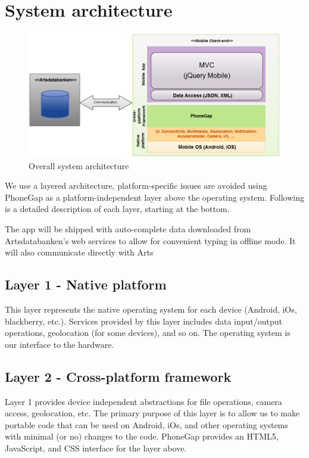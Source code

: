 \section{System architecture}
\begin{figure}[htb]
	\centering
	\includegraphics[width=1.0\textwidth]{architecture/architecture3.png}
	\caption{Overall system architecture}
	\label{fig:architecture}
\end{figure}

We use a layered architecture, platform-specific issues are avoided using
PhoneGap as a platform-independent layer above the operating system. Following
is a detailed description of each layer, starting at the bottom.

The app will be shipped with auto-complete data downloaded from Artsdatabanken's
web services to allow for convenient typing in offline mode. It will also
communicate directly with Arts

\subsection{Layer 1 - Native platform}

This layer represents the native operating system for each device (Android, iOs,
blackberry, etc.). Services provided by this layer includes data input/output
operations, geolocation (for some devices), and so on. The operating system is
our interface to the hardware.

\subsection{Layer 2 - Cross-platform framework}

Layer 1 provides device independent abstractions for file operations, camera
access, geolocation, etc. The primary purpose of this layer is to allow us to
make portable code that can be used on Android, iOs, and other operating systems
with minimal (or no) changes to the code. PhoneGap provides an HTML5,
JavaScript, and CSS interface for the layer above.

